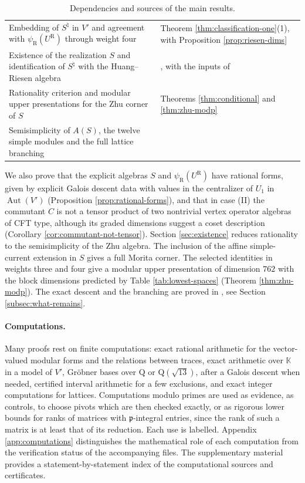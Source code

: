 \documentclass[leqno]{article}
\newcommand{\K}{\ensuremath{\mathbb{K}}}
\newcommand{\Q}{\mathrm{Q}}
\numberwithin{equation}{section}
\begin{document}
\begin{table}[ht]
\begin{tabular}{p{7.4cm}p{6cm}}
Embedding of $S^\natural$ in $V'$ and agreement with $\psi_{\mathrm R}(U^{\mathrm R})$ through weight four & Theorem \ref{thm:classification-one}(1), with Proposition \ref{prop:riesen-dims} \\
Existence of the realization $S$ and identification of $S^\natural$ with the Huang--Riesen algebra & \cite[Theorems 6.1 and 7.9, Corollary 7.10]{ArhIII}, with the inputs of \cite[Theorem 2.3]{ArhIII} \\
Rationality criterion and modular upper presentations for the Zhu corner of $S$ & Theorems \ref{thm:conditional} and \ref{thm:zhu-modp} \\
Semisimplicity of $A(S)$, the twelve simple modules and the full lattice branching & \cite[Theorem 2.2(F1)--(F3) and Appendix A]{ArhIII} \\
\hline
\end{tabular}
\caption{Dependencies and sources of the main results.}
\label{tab:dependencies}
\end{table}

We also prove that the explicit algebras $S$ and $\psi_{\mathrm R}(U^{\mathrm R})$ have rational forms, given by explicit Galois descent data with values in the centralizer of $U_1$ in $\operatorname{Aut}(V')$ (Proposition \ref{prop:rational-forms}), and that in case (II) the commutant $C$ is not a tensor product of two nontrivial vertex operator algebras of CFT type, although its graded dimensions suggest a coset description (Corollary \ref{cor:commutant-not-tensor}). Section \ref{sec:existence} reduces rationality to the semisimplicity of the Zhu algebra. The inclusion of the affine simple-current extension in $S$ gives a full Morita corner. The selected identities in weights three and four give a modular upper presentation of dimension $762$ with the block dimensions predicted by Table \ref{tab:lowest-spaces} (Theorem \ref{thm:zhu-modp}). The exact descent and the branching are proved in \cite[Appendix A]{ArhIII}, see Section \ref{subsec:what-remains}.

\paragraph{Computations.} Many proofs rest on finite computations: exact rational arithmetic for the vector-valued modular forms and the relations between traces, exact arithmetic over $\K$ in a model of $V'$, Gröbner bases over $\Q$ or $\Q(\sqrt{13})$, after a Galois descent when needed, certified interval arithmetic for a few exclusions, and exact integer computations for lattices. Computations modulo primes are used as evidence, as controls, to choose pivots which are then checked exactly, or as rigorous lower bounds for ranks of matrices with $\mathfrak p$-integral entries, since the rank of such a matrix is at least that of its reduction. Each use is labelled. Appendix \ref{app:computations} distinguishes the mathematical role of each computation from the verification status of the accompanying files. The supplementary material provides a statement-by-statement index of the computational sources and certificates.
\end{document}
